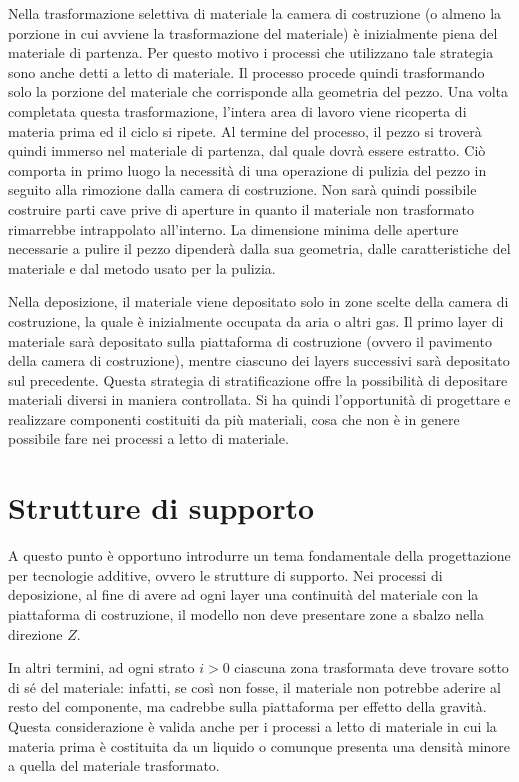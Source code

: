 Nella trasformazione selettiva di materiale la camera di costruzione (o almeno la porzione in cui avviene la trasformazione del materiale) è inizialmente piena del materiale di partenza.
Per questo motivo i processi che utilizzano tale strategia sono anche detti a letto di materiale. Il processo procede quindi trasformando solo la porzione del materiale che corrisponde alla geometria del pezzo.
Una volta completata questa trasformazione, l'intera area di lavoro viene ricoperta di materia prima ed il ciclo si ripete.
Al termine del processo, il pezzo si troverà quindi immerso nel materiale di partenza, dal quale dovrà essere estratto.
Ciò comporta in primo luogo la necessità di una operazione di pulizia del pezzo in seguito alla rimozione dalla camera di costruzione. Non sarà quindi possibile costruire parti cave prive di aperture in quanto il materiale non trasformato rimarrebbe intrappolato all'interno.
La dimensione minima delle aperture necessarie a pulire il pezzo dipenderà dalla sua
geometria, dalle caratteristiche del materiale e dal metodo usato per la pulizia.

Nella deposizione, il materiale viene depositato solo in zone scelte della camera di costruzione, la quale è inizialmente occupata da aria o altri gas.
Il primo layer di materiale sarà depositato sulla piattaforma di costruzione (ovvero il pavimento della camera di costruzione), mentre ciascuno dei layers successivi sarà depositato sul precedente.
Questa strategia di stratificazione offre la possibilità di depositare materiali diversi in maniera controllata. Si ha quindi l'opportunità di progettare e realizzare componenti costituiti da più materiali, cosa che non è in genere possibile fare nei processi a letto di materiale.

\section{Strutture di supporto}
A questo punto è opportuno introdurre un tema fondamentale della progettazione per
tecnologie additive, ovvero le strutture di supporto.
Nei processi di deposizione, al fine di avere ad ogni layer una continuità del materiale con la piattaforma di costruzione, il modello non deve presentare zone a sbalzo nella direzione $Z$.

In altri termini, ad ogni strato $i>0$ ciascuna zona trasformata deve trovare sotto di sé del materiale: infatti, se così non fosse, il materiale non potrebbe aderire al resto del componente, ma cadrebbe sulla piattaforma per effetto della gravità.
Questa considerazione è valida anche per i processi a letto di materiale in cui la materia prima è costituita da un liquido o comunque presenta una densità minore a quella del materiale trasformato.

